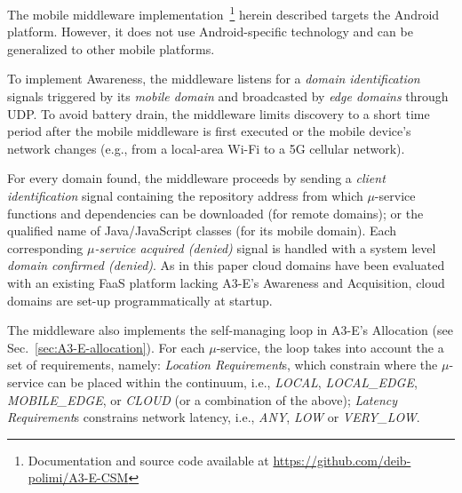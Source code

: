 
The mobile middleware implementation~\footnote{Documentation and source code available at \url{https://github.com/deib-polimi/A3-E-CSM}} herein described targets the Android platform. However, it does not use Android-specific technology and can be generalized to other mobile platforms.

To implement Awareness, the middleware listens for a \textit{domain identification} signals triggered by its \textit{mobile domain} and broadcasted by \textit{edge domains} through UDP. To avoid battery drain, the middleware limits discovery to 
a short time period after the mobile middleware is first executed or the mobile device's network changes (e.g., from a local-area Wi-Fi to a 5G cellular network). 

For every domain found, the middleware proceeds by sending a \textit{client identification} signal containing the repository address from which $\mu$-service functions and dependencies can be downloaded (for remote domains); or the qualified name of Java/JavaScript classes (for its mobile domain). Each corresponding \textit{$\mu$-service acquired (denied)} signal is handled with a system level \textit{domain confirmed (denied)}. As in this paper cloud domains have been evaluated with an existing FaaS platform lacking A3-E's Awareness and Acquisition, cloud domains are set-up programmatically at startup.



The middleware also implements the self-managing loop in A3-E's Allocation (see Sec.~\ref{sec:A3-E-allocation}). For each $\mu$-service, the loop takes into account the a set of requirements,
namely: \textit{Location Requirement}s, which constrain where the $\mu$-service can be placed within the continuum, i.e., \textit{LOCAL}, \textit{LOCAL\_EDGE}, \textit{MOBILE\_EDGE}, or \textit{CLOUD} (or a combination of the above); \textit{Latency Requirement}s constrains network latency, i.e., \textit{ANY}, \textit{LOW} or \textit{VERY\_LOW}.

